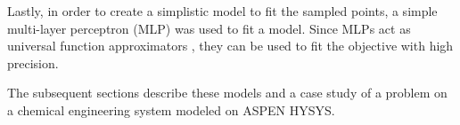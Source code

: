 \bigskip
\noindent
Lastly, in order to create a simplistic model to fit the sampled points, a simple multi-layer perceptron (MLP) was used to fit a model. Since MLPs act as universal function approximators \cite{TaehwanKim2001}, they can be used to fit the objective with high precision. \cite{Olden2002}

\bigskip
\noindent
The subsequent sections describe these models and a case study of a problem on a  chemical engineering system modeled on ASPEN HYSYS.

